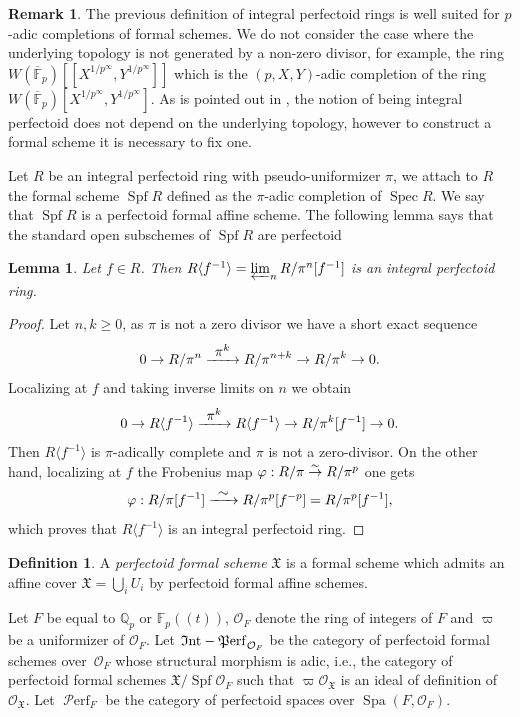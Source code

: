 \documentclass[11pt]{article}
\newcommand{\ie}{i.e.,\xspace}
\newcommand\To[1]{\mathchoice{\xrightarrow{\textstyle\kern4pt#1\kern3pt}}{\stackrel{#1}{\to}}{}{}}
\newcommand{\lcr}{[\![}
\newcommand{\rcr}{]\!]}
\newcommand{\lpr}{(\!(}
\newcommand{\rpr}{)\!)}
\numberwithin{equation}{section}
\newtheorem{lem}[prop]{Lemma}
\theoremstyle{definition}
\newtheorem{definition}[prop]{Definition}
\newtheorem{remark}[prop]{Remark}
\newcommand{\bb}[1]{\mathbb{#1}}
\newcommand{\n}[1]{\mathcal{#1}}
\newcommand{\f}[1]{\mathfrak{#1}}
\newcommand{\s}[1]{\mathscr{#1}}
\DeclareMathOperator{\Spf}{Spf}
\DeclareMathOperator{\Spec}{Spec}
\DeclareMathOperator{\Spa}{Spa}
\DeclareMathOperator{\Intperf}{\f{I}nt\textup{-}\f{P}erf}
\DeclareMathOperator{\Perf}{\s{P}erf}
\begin{document}
\begin{remark}
The previous definition of integral perfectoid rings is well suited for $p$-adic completions of formal schemes. We do not consider the case where the underlying topology is not generated by a non-zero divisor, for example, the ring $W(\overline{\bb{F}}_p)\lcr X^{1/p^\infty}, Y^{1/p^{\infty}}\rcr$ which is the $(p,X,Y)$-adic completion of the ring $W(\overline{\bb{F}}_p)[X^{1/p^{\infty}}, Y^{1/p^{\infty}}]$. As is pointed out in \cite[Rem.\,3.8]{MR3905467}, the notion of being integral perfectoid does not depend on the underlying topology, however to construct a formal scheme it is necessary to fix one.
\end{remark}

Let $R$ be an integral perfectoid ring with pseudo-uniformizer $\pi$, we attach to $R$ the formal scheme $\Spf R$ defined as the $\pi$-adic completion of $\Spec R$. We say that $\Spf R$ is a perfectoid formal affine scheme. The following lemma says that the standard open subschemes of $\Spf R$ are perfectoid

\begin{lem}
\label{lemLocalizationperf}
Let $f\in R$. Then $R\langle f^{-1} \rangle= \varprojlim_n R/\pi^n [f^{-1}]$ is an integral perfectoid ring.
\end{lem}

\begin{proof}
Let $n,k\geq 0$, as $\pi$ is not a zero divisor we have a short exact sequence
\[
0\to R/\pi^n \To{\pi^k} R/\pi^{n+k}\to R/\pi^k \to 0.
\]
Localizing at $f$ and taking inverse limits on $n$ we obtain
\[
0\to R\langle f^{-1}\rangle\To{\pi^k} R\langle f^{-1} \rangle\to R/\pi^{k} [f^{-1}]\to 0.
\]
Then $R\langle f^{-1} \rangle$ is $\pi$-adically complete and $\pi$ is not a zero-divisor. On the other hand, localizing at $f$ the Frobenius map
$\varphi: R/\pi \To{\sim} R/\pi^p$ one gets
\[
\varphi: R/\pi[f^{-1}]\To{\sim} R/\pi^{p}[f^{-p}]= R/\pi^p [f^{-1}],
\]
which proves that $R\langle f^{-1}\rangle$ is an integral perfectoid ring.
\end{proof}

\begin{definition}
A \textit{perfectoid formal scheme} $\f{X}$ is a formal scheme which admits an affine cover $\f{X}=\bigcup_i U_i$ by perfectoid formal affine schemes.
\end{definition}

Let $F$ be equal to $\bb{Q}_p$ or $\bb{F}_p\lpr t\rpr$, $\n{O}_F$ denote the ring of integers of $F$ and $\varpi$ be a uniformizer of $\n{O}_F$. Let $\Intperf_{\n{O}_F}$ be the category of perfectoid formal schemes over~$\n{O}_F$ whose structural morphism is adic, \ie the category of perfectoid formal schemes $\f{X}/\Spf \n{O}_F$ such that $\varpi \s{O}_{\f{X}}$ is an ideal of definition of $\s{O}_{\f{X}}$. Let $\Perf_F$ be the category of perfectoid spaces over $\Spa(F,\n{O}_F)$.
\end{document}
